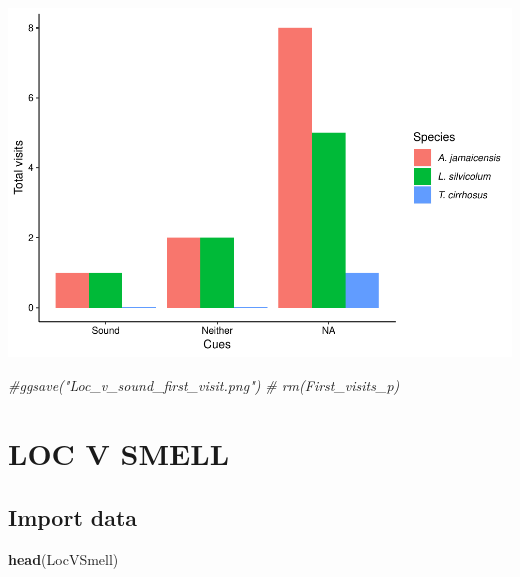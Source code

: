 \documentclass[]{article}
\newenvironment{Shaded}{\begin{snugshade}}{\end{snugshade}}
\newcommand{\KeywordTok}[1]{\textcolor[rgb]{0.13,0.29,0.53}{\textbf{{#1}}}}
\newcommand{\CommentTok}[1]{\textcolor[rgb]{0.56,0.35,0.01}{\textit{{#1}}}}
\newcommand{\NormalTok}[1]{{#1}}
\begin{document}
\includegraphics{Sensory_learning_files/figure-latex/unnamed-chunk-27-1.pdf}

\begin{Shaded}
\begin{Highlighting}[]
  \CommentTok{#ggsave("Loc_v_sound_first_visit.png")}
 \CommentTok{# rm(First_visits_p)}
\end{Highlighting}
\end{Shaded}

\section{LOC V SMELL}\label{loc-v-smell}

\subsection{Import data}\label{import-data-1}

\begin{Shaded}
\begin{Highlighting}[]
\KeywordTok{head}\NormalTok{(LocVSmell)}
\end{Highlighting}
\end{Shaded}
\end{document}
